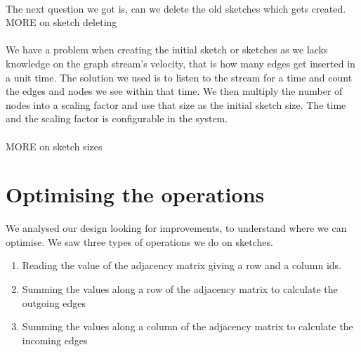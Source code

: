 \documentclass[12pt]{report}
\numberwithin{figure}{section}
\numberwithin{table}{section}
\begin{document}
\paragraph{}

The next question we got is, can we delete the old sketches which gets created.  
MORE on sketch deleting

\paragraph{}

We have a problem when creating the initial sketch or sketches as we lacks knowledge on the graph stream's velocity, that is how many edges get inserted in a unit time. The solution we used is to listen to the stream for a time and count the edges and nodes we see within that time. We then multiply the number of nodes into a scaling factor and use that size as the initial sketch size. The time and the scaling factor is configurable in the system.

\paragraph{}
MORE on sketch sizes

\paragraph{}

\section{Optimising the operations}
We analysed our design looking for improvements, to understand where we can optimise. We saw three types of operations we do on sketches.

\begin{enumerate}
\item Reading the value of the adjacency matrix giving a row and a column ids.
\item Summing the values along a row of the adjacency matrix to calculate the outgoing edges 
\item Summing the values along a column of the adjacency matrix to calculate the incoming edges
\end{enumerate}


\paragraph{}
\end{document}
